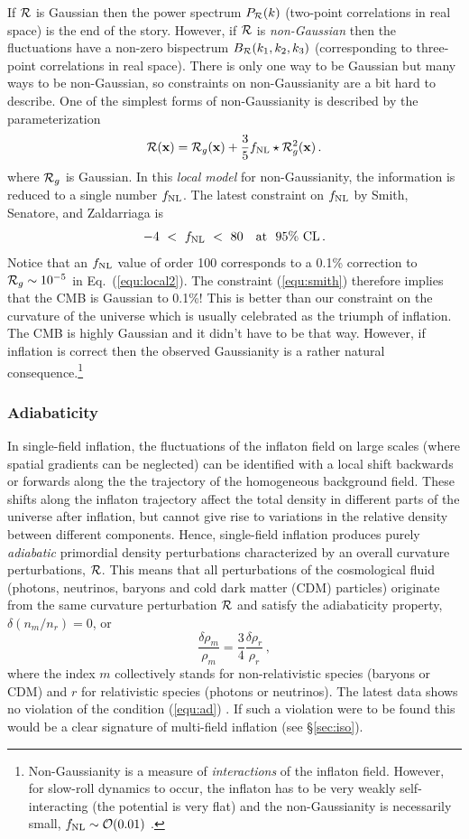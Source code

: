 \documentclass[12pt,letterpaper,rotate]{article}
\def\beq{\begin{equation}}
\def\eeq{\end{equation}}
\def\R{{\cal R}}
\begin{document}
{If $\R$ is Gaussian then the power spectrum $P_\R(k)$ (two-point correlations in real space) is the end of the story.
However, if $\R$ is {\it non-Gaussian} then the fluctuations have a non-zero bispectrum $B_\R(k_1, k_2, k_3)$ (corresponding to three-point correlations in real space).
There is only one way to be Gaussian but many ways to be non-Gaussian, so constraints on non-Gaussianity are a bit hard to describe.
One of the simplest forms of non-Gaussianity is described by the parameterization
\beq
\label{equ:local2}
\R({\bf x}) = \R_g({\bf x}) + \frac{3}{5} f_{\rm NL} \star \R_g^2({\bf x})\, .
\eeq
where $\R_g$ is Gaussian. In this {\it local model} for non-Gaussianity, the information is reduced to a single number $f_{\rm NL}$.
The latest constraint on $f_{\rm NL}$ by Smith, Senatore, and Zaldarriaga \cite{Smith:2009jr} is
\beq
\label{equ:smith}
- 4 \ < \ f_{\rm NL} \ < \ 80 \quad {\rm at} \ \ 95\% \ {\rm CL}\, .
\eeq
Notice that an $f_{\rm NL}$ value of order 100 corresponds to a 0.1\% correction to $\R_g \sim 10^{-5}$ in Eq.~(\ref{equ:local2}).
The constraint (\ref{equ:smith}) therefore implies that the CMB is Gaussian to 0.1\%! This is better than our constraint on the curvature of the universe which is usually celebrated as the triumph of inflation.
The CMB is highly Gaussian and it didn't have to be that way.
However, if inflation is correct then the observed Gaussianity is a rather natural consequence.\footnote{Non-Gaussianity is a measure of {\it interactions} of the inflaton field. However, for slow-roll dynamics to occur, the inflaton has to be very weakly self-interacting (the potential is very flat) and the non-Gaussianity is necessarily small, $f_{\rm NL} \sim {\cal O}(0.01)$ \cite{malda}.}

\subsubsection{Adiabaticity}

In single-field inflation, the fluctuations of the inflaton field on large scales (where spatial gradients can be neglected) can be identified with a local shift backwards or forwards along the the trajectory of the homogeneous background field. These shifts along the inflaton trajectory affect the total density in different parts of the universe after inflation, but cannot give rise to variations in the relative density between different components.
Hence, single-field inflation produces purely {\it adiabatic} primordial density perturbations characterized by an overall curvature perturbations, $\R$.
This means that all perturbations of the cosmological fluid (photons, neutrinos, baryons and cold dark matter (CDM) particles) originate from the same curvature perturbation $\R$ and satisfy the adiabaticity property, $\delta(n_m/n_r) =0$, or
\beq
\label{equ:ad}
\frac{\delta \rho_m}{\rho_m} = \frac{3}{4} \frac{\delta \rho_r}{\rho_r}\, ,
\eeq
where the index $m$ collectively stands for non-relativistic species (baryons or CDM) and $r$ for relativistic species (photons or neutrinos).
The latest data shows no violation of the condition (\ref{equ:ad}) \cite{WMAP5}.
If such a violation were to be found this would be a clear signature of multi-field inflation (see \S\ref{sec:iso}).

}
\end{document}
